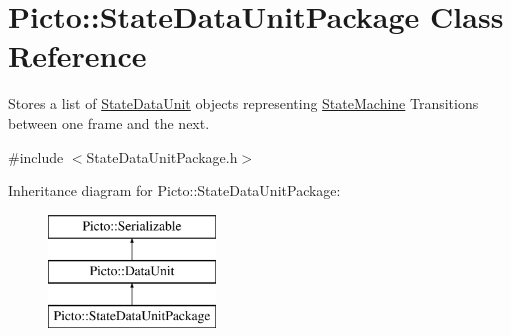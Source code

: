 \hypertarget{class_picto_1_1_state_data_unit_package}{\section{Picto\-:\-:State\-Data\-Unit\-Package Class Reference}
\label{class_picto_1_1_state_data_unit_package}
}


Stores a list of \hyperlink{class_picto_1_1_state_data_unit}{State\-Data\-Unit} objects representing \hyperlink{class_picto_1_1_state_machine}{State\-Machine} Transitions between one frame and the next.  




{\ttfamily \#include $<$State\-Data\-Unit\-Package.\-h$>$}

Inheritance diagram for Picto\-:\-:State\-Data\-Unit\-Package\-:\begin{figure}[H]
\begin{center}
\leavevmode
\includegraphics[height=3.000000cm]{class_picto_1_1_state_data_unit_package}
\end{center}
\end{figure}
